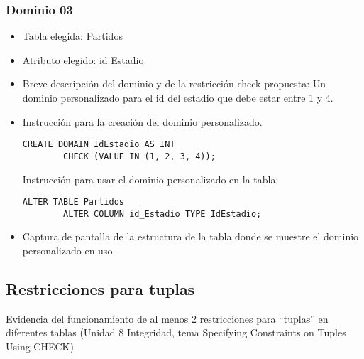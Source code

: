 \subsubsection*{Dominio 03}
\begin{itemize}
    \item Tabla elegida: Partidos
    \item Atributo elegido:  id Estadio
    \item Breve descripción del dominio y de la restricción check propuesta:  Un dominio personalizado para el id del estadio que debe estar entre 1 y 4.
    \item Instrucción para la creación del dominio personalizado.
    \begin{lstlisting}[caption={Tablas para la BdDatos}, label={lst:sql_estadios}]
        CREATE DOMAIN IdEstadio AS INT
        CHECK (VALUE IN (1, 2, 3, 4));
    \end{lstlisting}
    Instrucción para usar el dominio personalizado en la tabla:
    \begin{lstlisting}[caption={Tablas para la BdDatos}, label={lst:sql_estadios}]
        ALTER TABLE Partidos
        ALTER COLUMN id_Estadio TYPE IdEstadio;        
    \end{lstlisting}
    \item Captura de pantalla de la estructura de la tabla donde se muestre el dominio personalizado
    en uso.
\end{itemize}


\subsection{Restricciones para tuplas}

Evidencia del funcionamiento de al menos 2 restricciones para “tuplas” en diferentes tablas (Unidad 8 Integridad, tema Specifying Constraints on Tuples Using CHECK)

